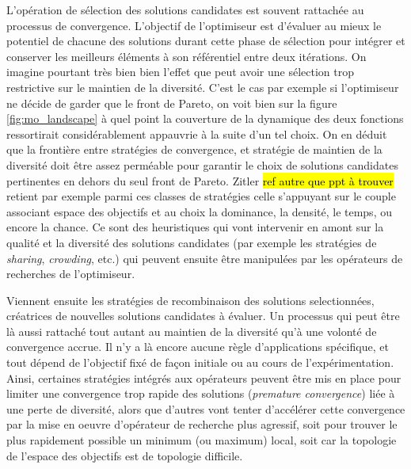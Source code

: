 L'opération de sélection des solutions candidates est souvent rattachée au processus de convergence. L'objectif de l'optimiseur est d'évaluer au mieux le potentiel de chacune des solutions durant cette phase de sélection pour intégrer et conserver les meilleurs éléments à son référentiel entre deux itérations. On imagine pourtant très bien bien l'effet que peut avoir une sélection trop restrictive sur le maintien de la diversité. C'est le cas par exemple si l'optimiseur ne décide de garder que le front de Pareto, on voit bien sur la figure \ref{fig:mo_landscape} à quel point la couverture de la dynamique des deux fonctions ressortirait considérablement appauvrie à la suite d'un tel choix. On en déduit que la frontière entre stratégies de convergence, et stratégie de maintien de la diversité doit être assez perméable pour garantir le choix de solutions candidates pertinentes en dehors du seul front de Pareto. Zitler \hl{ref autre que ppt à trouver} retient par exemple parmi ces classes de stratégies celle s'appuyant sur le couple associant espace des objectifs et au choix la dominance, la densité, le temps, ou encore la chance. Ce sont des heuristiques qui vont intervenir en amont sur la qualité et la diversité des solutions candidates (par exemple les stratégies de \textit{sharing}, \textit{crowding}, etc.) qui peuvent ensuite être manipulées par les opérateurs de recherches de l'optimiseur.

Viennent ensuite les stratégies de recombinaison des solutions selectionnées, créatrices de nouvelles solutions candidates à évaluer. Un processus qui peut être là aussi rattaché tout autant au maintien de la diversité qu'à une volonté de convergence accrue. Il n'y a là encore aucune règle d'applications spécifique, et tout dépend de l'objectif fixé de façon initiale ou au cours de l'expérimentation. Ainsi, certaines stratégies intégrés aux opérateurs peuvent être mis en place pour limiter une convergence trop rapide des solutions (\textit{premature convergence}) liée à une perte de diversité, alors que d'autres vont tenter d'accélérer cette convergence par la mise en oeuvre d'opérateur de recherche plus agressif, soit pour trouver le plus rapidement possible un minimum (ou maximum) local, soit car la topologie de l'espace des objectifs est de topologie difficile. 

